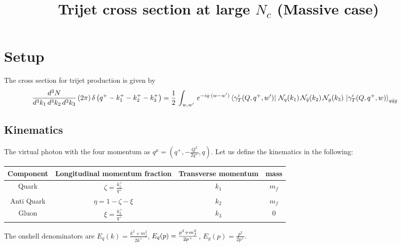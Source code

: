 \documentclass[9pt]{article}
\title{Trijet cross section at large $N_{c}$ (Massive case)}
\author{}
\date{}
\numberwithin{equation}{section}
\begin{document}
\maketitle
\section{Setup}
The cross section for trijet production is given by
\begin{align}
    \frac{d^{3}N}{d^{3}k_{1}\,d^{3}k_{2}\, d^{3}k_{3}}\, (2\pi)\,\delta\left(q^{+}-k^{+}_{1}-k^{+}_{2}-k^{+}_{3}\right) & =  \frac{1}{2}\,\int_{w,w'}\, e^{-iq\cdot (w-w')} 
\bra{\gamma^{i}_{T}(Q,q^{+},w')}\,\mathcal{N}_{q}(k_{1})\,\mathcal{N}_{\Bar{q}}(k_{2})\,\mathcal{N}_{g}(k_{3})\,\ket{\gamma^{i}_{T}(Q,q^{+},w)}_{q\Bar{q}g}
\end{align}
\subsection{Kinematics}
The virtual photon with the four momentum as $q^{\mu} = \left(q^{+},-\frac{Q^{2}}{2q^{+}},q\right)$. Let us define the kinematics in the following:
\begin{table}[h!]
\centering
\begin{tabular}{||c c c c||} 
 \hline
 Component & Longitudinal momentum fraction & Transverse momentum & mass \\ [0.5ex] 
 \hline\hline
 Quark & $\zeta = \frac{k^{+}_{1}}{q^{+}}$  & $k_{1}$ & $m_{f}$ \\ 
 Anti Quark & $\eta = 1-\zeta-\xi$  &  $k_{2}$ & $m_{f}$ \\
 Gluon & $\xi = \frac{k^{+}_{3}}{q^{+}}$ & $k_{3}$ & $0$ \\
 \hline
\end{tabular}
\label{table:1}
\end{table}
The onshell denominators are $E_{q}(k) = \frac{k^{2}+m^{2}_{f}}{2k^{+}}$, $E_{\Bar{q}}(p) = \frac{p^{2}+m_{f}^{2}}{2p^{+}}$, $E_{g}(p) = \frac{p^{2}}{2p^{+}}$.  
\end{document}
